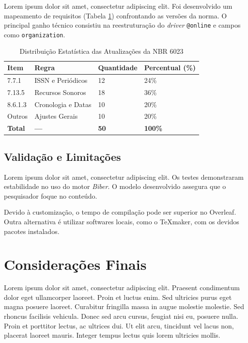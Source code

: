 \documentclass[12pt,a4paper]{article}
\begin{document}
Lorem ipsum dolor sit amet, consectetur adipiscing elit. Foi desenvolvido um mapeamento de requisitos (Tabela \ref{tab:atualizacoes_nbr6023}) confrontando as versões da norma. O principal ganho técnico consistiu na reestruturação do \textit{driver} \verb|@online| e campos como \verb|organization|. 

\begin{table}[H]
    \centering
    \caption{Distribuição Estatística das Atualizações da NBR 6023}
    \label{tab:atualizacoes_nbr6023}
    \small
    \begin{tabular}{@{} p{2cm} p{4cm} p{3cm} p{3cm} @{}}
        \toprule
        \textbf{Item} & \textbf{Regra} & \textbf{Quantidade} & \textbf{Percentual (\%)} 
        \\ \midrule
        7.7.1   & ISSN e Periódicos & 12 & 24\% \\ \midrule
        7.13.5  & Recursos Sonoros   & 18 & 36\% \\ \midrule
        8.6.1.3 & Cronologia e Datas & 10 & 20\% \\ \midrule
        Outros  & Ajustes Gerais     & 10 & 20\% \\ \midrule
        \textbf{Total} & \textbf{---} & \textbf{50} & \textbf{100\%} \\
        \bottomrule
    \end{tabular}
\end{table}


\subsection{Validação e Limitações}

Lorem ipsum dolor sit amet, consectetur adipiscing elit. Os testes demonstraram estabilidade no uso do motor \textit{Biber}. O modelo desenvolvido assegura que o pesquisador foque no conteúdo. 

Devido à customização, o tempo de compilação pode ser superior no Overleaf. Outra alternativa é utilizar softwares locais, como o TeXmaker, com os devidos pacotes instalados.


\clearpage
\section{Considerações Finais}
\label{conclusao}
Lorem ipsum dolor sit amet, consectetur adipiscing elit. Praesent condimentum dolor eget ullamcorper laoreet. Proin et luctus enim. Sed ultricies purus eget magna posuere laoreet. Curabitur fringilla massa in augue molestie molestie. Sed rhoncus facilisis vehicula. Donec sed arcu cursus, feugiat nisi eu, posuere nulla. Proin et porttitor lectus, ac ultrices dui. Ut elit arcu, tincidunt vel lacus non, placerat laoreet mauris. Integer tempus lectus quis lorem ultricies mollis.
\end{document}
